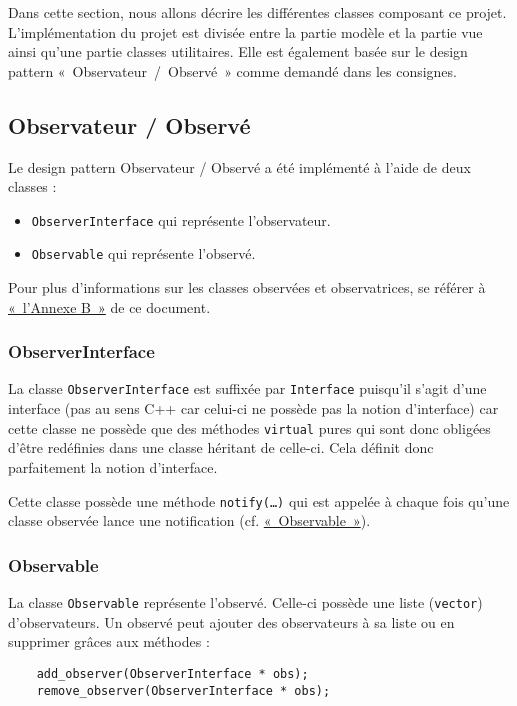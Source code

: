 \documentclass[]{report}
\begin{document}
Dans cette section, nous allons décrire les différentes classes
composant ce projet.
L’implémentation du projet est divisée entre la partie modèle et la partie vue ainsi 
qu'une partie classes utilitaires.
Elle est également basée sur le design pattern «~Observateur~/~Observé~» comme demandé
dans les consignes. 

\subsection{\label{OO}Observateur / Observé}

Le design pattern Observateur / Observé a été implémenté à l'aide de deux classes : 

\begin{itemize}
    \item \texttt{ObserverInterface} qui représente l'observateur.
    \item \texttt{Observable} qui représente l'observé.
\end{itemize}

Pour plus d'informations sur les classes observées et observatrices, se référer à
\hyperref[AnnexeB]{«~l'Annexe B~»} de ce document.

\subsubsection{ObserverInterface}

La classe \texttt{ObserverInterface} est suffixée par \texttt{Interface} puisqu'il
s'agit d'une interface (pas au sens C++ car celui-ci ne possède pas la notion
d'interface) car cette classe ne possède que des méthodes \texttt{virtual} pures
qui sont donc obligées d'être redéfinies dans une classe héritant de celle-ci.
Cela définit donc parfaitement la notion d'interface.

Cette classe possède une méthode \texttt{notify(\dots)} qui est appelée à chaque fois
qu'une classe observée lance une notification (cf. \hyperref[Observable]{«~Observable~»}).

\subsubsection{\label{Observable}Observable}

La classe \texttt{Observable} représente l'observé. Celle-ci possède
une liste (\texttt{vector}) d'observateurs.
Un observé peut ajouter des observateurs à sa liste ou en supprimer grâces aux méthodes :
\begin{lstlisting}
    add_observer(ObserverInterface * obs);
    remove_observer(ObserverInterface * obs);
\end{lstlisting}
\end{document}
